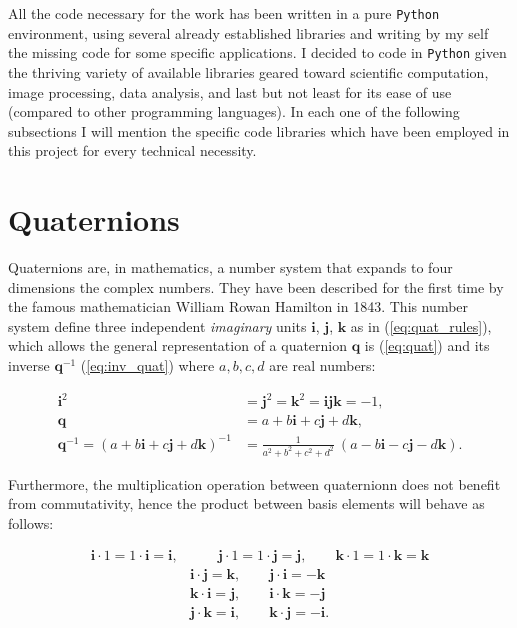 \documentclass[12pt,a4paper]{report}
\begin{document}
All the code necessary for the work has been written in a pure \texttt{Python} environment, using several already established libraries and writing by my self the missing code for some specific applications. I decided to code in \texttt{Python} given the thriving variety of available libraries geared toward scientific computation, image processing, data analysis, and last but not least for its ease of use (compared to other programming languages). In each one of the following subsections I will mention the specific code libraries which have been employed in this project for every technical necessity.

        \section{Quaternions} \label{ssec:quat}
    Quaternions are, in mathematics, a number system that expands to four dimensions the complex numbers. They have been described for the first time by the famous mathematician William Rowan Hamilton in 1843. This number system define three independent \textit{imaginary} units $\bm{i}$, $\bm{j}$, $\bm{k}$ as in (\ref{eq:quat_rules}), which allows the general representation of a quaternion $\bm{q}$ is (\ref{eq:quat}) and its inverse $\bm{q}^{-1}$ (\ref{eq:inv_quat}) where $a,b,c,d$ are real numbers:

    \begin{align}
        \bm{i}^2 & = \bm{j}^2 = \bm{k}^2 = \bm{i}\bm{j}\bm{k} = -1, \label{eq:quat_rules}\\
        \bm{q} & = a + b\bm{i} + c\bm{j} + d\bm{k}, \label{eq:quat}\\
        \bm{q}^{-1 } = (a + b\bm{i} + c\bm{j} + d\bm{k})^{-1} & = \frac{1}{a^2 + b^2 + c^2 +d^2}\ (a - b\bm{i} - c\bm{j} - d\bm{k}). \label{eq:inv_quat}
    \end{align}

    Furthermore, the multiplication operation between quaternionn does not benefit from commutativity, hence the product between basis elements will behave as follows:

    \begin{align}
        \bm{i} \cdot 1 = 1 \cdot \bm{i} = \bm{i}, & \qquad  \bm{j} \cdot 1 = 1 \cdot \bm{j} = \bm{j}, \qquad \bm{k} \cdot 1 = 1 \cdot \bm{k} = \bm{k} \label{eq:Ham_prod}\\
        & \bm{i} \cdot \bm{j}= \bm{k}, \qquad \bm{j} \cdot \bm{i}= -\bm{k} \nonumber \\
        & \bm{k} \cdot \bm{i}= \bm{j}, \qquad \bm{i} \cdot \bm{k}= -\bm{j} \nonumber \\
        & \bm{j} \cdot \bm{k}= \bm{i}, \qquad \bm{k} \cdot \bm{j}= -\bm{i}. \nonumber
    \end{align}
\end{document}
